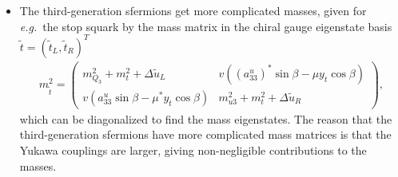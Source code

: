 \documentclass[twoside,english]{uiofysmaster}
\begin{document}
\begin{itemize}
 	\item The third-generation sfermions get more complicated masses, given for {\it e.g.}\ the stop squark by the mass matrix in the chiral gauge eigenstate basis $\tilde t = (\tilde t_L, \tilde t_R)^T$
 	\begin{align}
 		m^2_{\tilde t} = \begin{pmatrix}
 			m^2_{Q_3} + m_t^2 + \Delta \tilde u_L & v((a_{33}^u)^* \sin\beta - \mu y_t \cos\beta)\\
 			v(a_{33}^u \sin\beta - \mu^* y_t \cos\beta) & m^2_{u3} + m^2_t + \Delta \tilde u_R
 		\end{pmatrix},
 	\end{align}
 	which can be diagonalized to find the mass eigenstates. The reason that the third-generation sfermions have more complicated mass matrices is that the Yukawa couplings are larger, giving non-negligible contributions to the masses.
 \end{itemize}
\end{document}
